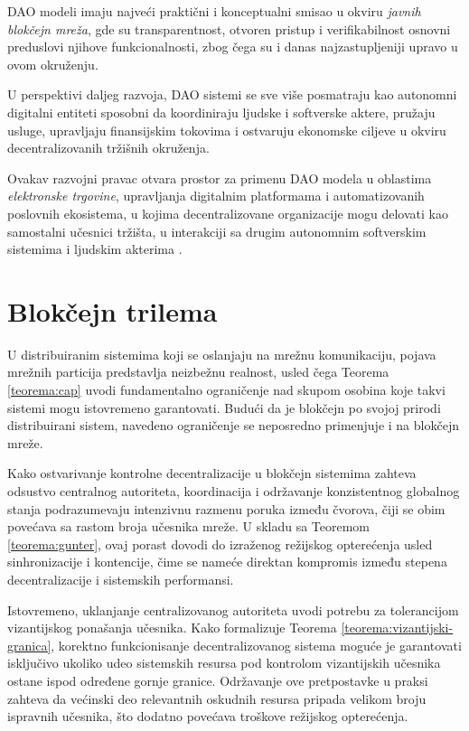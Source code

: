DAO modeli imaju najveći praktični i konceptualni smisao u okviru \textit{javnih blokčejn mreža}, gde su transparentnost, otvoren pristup i verifikabilnost osnovni preduslovi njihove funkcionalnosti, zbog čega su i danas najzastupljeniji upravo u ovom okruženju.

U perspektivi daljeg razvoja, DAO sistemi se sve više posmatraju kao autonomni digitalni entiteti sposobni da koordiniraju ljudske i softverske aktere, pružaju usluge, upravljaju finansijskim tokovima i ostvaruju ekonomske ciljeve u okviru decentralizovanih tržišnih okruženja. 

Ovakav razvojni pravac otvara prostor za primenu DAO modela u oblastima \textit{elektronske trgovine}, upravljanja digitalnim platformama i automatizovanih poslovnih ekosistema, u kojima decentralizovane organizacije mogu delovati kao samostalni učesnici tržišta, u interakciji sa drugim autonomnim softverskim sistemima i ljudskim akterima \cite{de2018blockchain}.

\section{Blokčejn trilema}
U distribuiranim sistemima koji se oslanjaju na mrežnu komunikaciju, pojava mrežnih particija predstavlja neizbežnu realnost, usled čega Teorema \ref{teorema:cap} uvodi fundamentalno ograničenje nad skupom osobina koje takvi sistemi mogu istovremeno garantovati. Budući da je blokčejn po svojoj prirodi distribuirani sistem, navedeno ograničenje se neposredno primenjuje i na blokčejn mreže.

Kako ostvarivanje kontrolne decentralizacije u blokčejn sistemima zahteva odsustvo centralnog autoriteta, koordinacija i održavanje konzistentnog globalnog stanja podrazumevaju intenzivnu razmenu poruka između čvorova, čiji se obim povećava sa rastom broja učesnika mreže. U skladu sa Teoremom \ref{teorema:gunter}, ovaj porast dovodi do izraženog režijskog opterećenja usled sinhronizacije i kontencije, čime se nameće direktan kompromis između stepena decentralizacije i sistemskih performansi.

Istovremeno, uklanjanje centralizovanog autoriteta uvodi potrebu za tolerancijom vizantijskog ponašanja učesnika. Kako formalizuje Teorema \ref{teorema:vizantijski-granica}, korektno funkcionisanje decentralizovanog sistema moguće je garantovati isključivo ukoliko udeo sistemskih resursa pod kontrolom vizantijskih učesnika ostane ispod određene gornje granice. Održavanje ove pretpostavke u praksi zahteva da većinski deo relevantnih oskudnih resursa pripada velikom broju ispravnih učesnika, što dodatno povećava troškove režijskog opterećenja.

